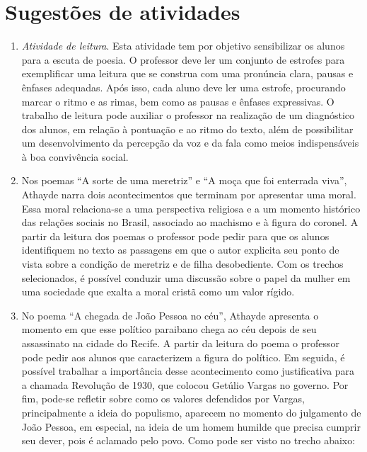 \section{Sugestões de atividades}
\begin{enumerate}

\item \textit{Atividade de leitura}. Esta atividade tem por objetivo sensibilizar os
alunos para a escuta de poesia. O professor deve ler um conjunto de
estrofes para exemplificar uma leitura que se construa com uma
pronúncia clara, pausas e ênfases adequadas. Após isso, cada aluno deve
ler uma estrofe, procurando marcar o ritmo e as rimas, bem como as
pausas e ênfases expressivas. O trabalho de leitura pode auxiliar o
professor na realização de um diagnóstico dos alunos, em relação à
pontuação e ao ritmo do texto, além de possibilitar um desenvolvimento
da percepção da voz e da fala como meios indispensáveis à boa
convivência social.

\item Nos poemas ``A sorte de uma
meretriz'' e ``A moça que foi
enterrada viva'', Athayde narra dois acontecimentos
que terminam por apresentar uma moral. Essa moral relaciona-se a
uma perspectiva religiosa e a um momento histórico das relações
sociais no Brasil, associado ao machismo e à figura do coronel. A
partir da leitura dos poemas o professor pode pedir para que os alunos
identifiquem no texto as passagens em que o autor explicita seu ponto
de vista sobre a condição de meretriz e de filha desobediente. Com os
trechos selecionados, é possível conduzir uma discussão sobre o
papel da mulher em uma sociedade que exalta a moral
cristã como um valor rígido. 

\item No poema ``A chegada de João Pessoa no
céu'', Athayde apresenta o momento em que esse
político paraibano chega ao céu depois de seu assassinato na cidade do
Recife. A partir da leitura do poema o professor pode pedir aos alunos
que caracterizem a figura do político. Em seguida, é possível trabalhar
a importância desse acontecimento como justificativa para a chamada
Revolução de 1930, que colocou Getúlio Vargas no governo. Por fim,
pode-se refletir sobre como os valores defendidos por Vargas,
principalmente a ideia do populismo, aparecem no momento do julgamento
de João Pessoa, em especial, na ideia de um homem humilde que precisa
cumprir seu dever, pois é aclamado pelo povo. Como pode ser visto no
trecho abaixo:

\begin{verse}



\end{verse}
\end{enumerate}
